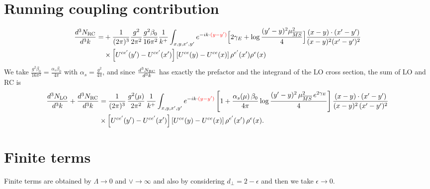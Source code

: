 \documentclass[9pt]{article}
\numberwithin{equation}{section}
\newcommand{\ph}[1]{{\color{red}#1}}
\begin{document}
\section{Running coupling contribution}
\begin{align}
\frac{d^{3}N_{\rm RC}}{d^{3}k}= & +\frac{1}{(2\pi)^{3}}\frac{g^{2}}{2\pi^{2}}\frac{g^{2}\beta_{0}}{16\pi^{2}}\frac{1}{k^{+}}\int_{x,y,x',y'}e^{-ik\cdot\ph{(y-y')}}\Big[2\gamma_{E}+\log\frac{(y'-y)^{2}\mu^{2}_{\overline{MS}}}{4}\Big]\frac{(x-y)\cdot(x'-y')}{(x-y)^{2}(x'-y')^{2}}\notag\\
&\times\left[U^{ce'}(y') - U^{ce'}(x')\right]\left[U^{ce}(y) - U^{ce}(x)\right]\rho^{e'}(x')\rho^{e}(x)
\end{align}
We take $\frac{g^{2}\beta_{0}}{16\pi^{2}}=\frac{\alpha_{s}\beta_{0}}{4\pi}$ with $\alpha_{s}=\frac{g^{2}}{4\pi}$, and since $\frac{d^{3}N_{\rm RC}}{d^{3}k}$ has exactly the prefactor and the integrand of the LO cross section, the sum of LO and RC is
\begin{align}
\frac{d^{3}N_{\rm LO}}{d^{3}k}+\frac{d^{3}N_{\rm RC}}{d^{3}k}&=\frac{1}{(2\pi)^{3}}\,\frac{g^{2}(\mu)}{2\pi^{2}}\,\frac{1}{k^{+}}\int_{x,y,x',y'}e^{-ik\cdot\ph{(y-y')}}\left[1+\frac{\alpha_{s}(\mu)\,\beta_{0}}{4\pi}\log\frac{(y'-y)^{2}\,\mu^{2}_{\overline{MS}}\,e^{2\gamma_{E}}}{4}\right]\frac{(x-y)\cdot(x'-y')}{(x-y)^{2}\,(x'-y')^{2}}\notag\\
&\times\left[U^{ce'}(y')-U^{ce'}(x')\right]\left[U^{ce}(y)-U^{ce}(x)\right]\rho^{e'}(x')\,\rho^{e}(x).
\end{align}
\section{Finite terms}
Finite terms are obtained by $\Lambda \to 0$ and $\vee\to \infty $ and also by considering $d_{\perp} = 2-\epsilon$ and then we take $\epsilon \to 0$. 
\end{document}
